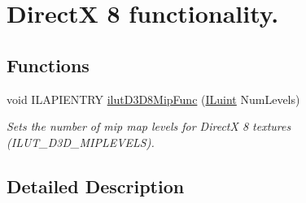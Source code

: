 \hypertarget{group__ilut__dx8}{\section{Direct\+X 8 functionality.}
\label{group__ilut__dx8}
}
\subsection*{Functions}
\begin{DoxyCompactItemize}
\item 
\hypertarget{group__ilut__dx8_ga8e8160f8c33ba5196a0df27619fa9240}{void I\+L\+A\+P\+I\+E\+N\+T\+R\+Y \hyperlink{group__ilut__dx8_ga8e8160f8c33ba5196a0df27619fa9240}{ilut\+D3\+D8\+Mip\+Func} (\hyperlink{group__il__types_gaff8e86a1072c8d7cfe387fb87c6ed8e1}{I\+Luint} Num\+Levels)}\label{group__ilut__dx8_ga8e8160f8c33ba5196a0df27619fa9240}

\begin{DoxyCompactList}\small\item\em Sets the number of mip map levels for Direct\+X 8 textures (I\+L\+U\+T\+\_\+\+D3\+D\+\_\+\+M\+I\+P\+L\+E\+V\+E\+L\+S). \end{DoxyCompactList}\end{DoxyCompactItemize}


\subsection{Detailed Description}
